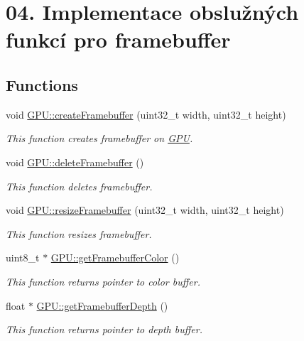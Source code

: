 \hypertarget{group__framebuffer__tasks}{}\section{04. Implementace obslužných funkcí pro framebuffer}
\label{group__framebuffer__tasks}
\subsection*{Functions}
\begin{DoxyCompactItemize}
\item 
void \hyperlink{group__framebuffer__tasks_gab041c171fc07011d13ec608fc94a1d1c}{G\+P\+U\+::create\+Framebuffer} (uint32\+\_\+t width, uint32\+\_\+t height)
\begin{DoxyCompactList}\small\item\em This function creates framebuffer on \hyperlink{classGPU}{G\+PU}. \end{DoxyCompactList}\item 
void \hyperlink{group__framebuffer__tasks_gaaaa9fbf5f3c28f27f092c2c6883d6e60}{G\+P\+U\+::delete\+Framebuffer} ()
\begin{DoxyCompactList}\small\item\em This function deletes framebuffer. \end{DoxyCompactList}\item 
void \hyperlink{group__framebuffer__tasks_ga6391eaf70194c39bf523ddc875ca176d}{G\+P\+U\+::resize\+Framebuffer} (uint32\+\_\+t width, uint32\+\_\+t height)
\begin{DoxyCompactList}\small\item\em This function resizes framebuffer. \end{DoxyCompactList}\item 
uint8\+\_\+t $\ast$ \hyperlink{group__framebuffer__tasks_ga67504b8136ef6283ad6efbb5323a0ef8}{G\+P\+U\+::get\+Framebuffer\+Color} ()
\begin{DoxyCompactList}\small\item\em This function returns pointer to color buffer. \end{DoxyCompactList}\item 
float $\ast$ \hyperlink{group__framebuffer__tasks_gab755d51ff9686df1fb9b2892b9861c1d}{G\+P\+U\+::get\+Framebuffer\+Depth} ()
\begin{DoxyCompactList}\small\item\em This function returns pointer to depth buffer. \end{DoxyCompactList}\item 

\end{DoxyCompactItemize}
